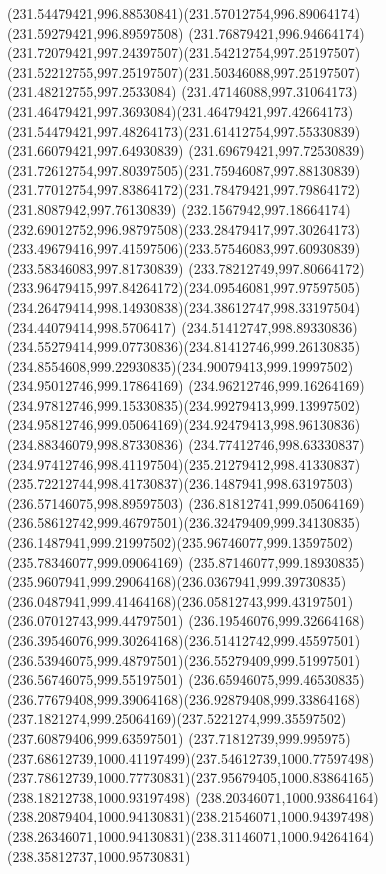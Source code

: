 {{		\curveto(231.54479421,996.88530841)(231.57012754,996.89064174)(231.59279421,996.89597508)
		\curveto(231.76879421,996.94664174)(231.72079421,997.24397507)(231.54212754,997.25197507)
		\curveto(231.52212755,997.25197507)(231.50346088,997.25197507)(231.48212755,997.2533084)
		\curveto(231.47146088,997.31064173)(231.46479421,997.3693084)(231.46479421,997.42664173)
		\curveto(231.54479421,997.48264173)(231.61412754,997.55330839)(231.66079421,997.64930839)
		\curveto(231.69679421,997.72530839)(231.72612754,997.80397505)(231.75946087,997.88130839)
		\curveto(231.77012754,997.83864172)(231.78479421,997.79864172)(231.8087942,997.76130839)
		\curveto(232.1567942,997.18664174)(232.69012752,996.98797508)(233.28479417,997.30264173)
		\curveto(233.49679416,997.41597506)(233.57546083,997.60930839)(233.58346083,997.81730839)
		\curveto(233.78212749,997.80664172)(233.96479415,997.84264172)(234.09546081,997.97597505)
		\curveto(234.26479414,998.14930838)(234.38612747,998.33197504)(234.44079414,998.5706417)
		\curveto(234.51412747,998.89330836)(234.55279414,999.07730836)(234.81412746,999.26130835)
		\curveto(234.8554608,999.22930835)(234.90079413,999.19997502)(234.95012746,999.17864169)
		\curveto(234.96212746,999.16264169)(234.97812746,999.15330835)(234.99279413,999.13997502)
		\curveto(234.95812746,999.05064169)(234.92479413,998.96130836)(234.88346079,998.87330836)
		\curveto(234.77412746,998.63330837)(234.97412746,998.41197504)(235.21279412,998.41330837)
		\curveto(235.72212744,998.41730837)(236.1487941,998.63197503)(236.57146075,998.89597503)
		\curveto(236.81812741,999.05064169)(236.58612742,999.46797501)(236.32479409,999.34130835)
		\curveto(236.1487941,999.21997502)(235.96746077,999.13597502)(235.78346077,999.09064169)
		\curveto(235.87146077,999.18930835)(235.9607941,999.29064168)(236.0367941,999.39730835)
		\curveto(236.0487941,999.41464168)(236.05812743,999.43197501)(236.07012743,999.44797501)
		\curveto(236.19546076,999.32664168)(236.39546076,999.30264168)(236.51412742,999.45597501)
		\curveto(236.53946075,999.48797501)(236.55279409,999.51997501)(236.56746075,999.55197501)
		\curveto(236.65946075,999.46530835)(236.77679408,999.39064168)(236.92879408,999.33864168)
		\curveto(237.1821274,999.25064169)(237.5221274,999.35597502)(237.60879406,999.63597501)
		\curveto(237.71812739,999.995975)(237.68612739,1000.41197499)(237.54612739,1000.77597498)
		\curveto(237.78612739,1000.77730831)(237.95679405,1000.83864165)(238.18212738,1000.93197498)
		\curveto(238.20346071,1000.93864164)(238.20879404,1000.94130831)(238.21546071,1000.94397498)
		\curveto(238.26346071,1000.94130831)(238.31146071,1000.94264164)(238.35812737,1000.95730831)
}}
